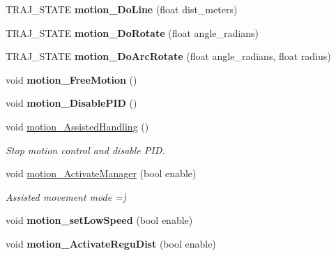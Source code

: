 \begin{DoxyCompactItemize}
T\+R\+A\+J\+\_\+\+S\+T\+A\+TE {\bfseries motion\+\_\+\+Do\+Line} (float dist\+\_\+meters)
\item 
\mbox{\label{classAsservDriver_aca1011c3fb10e594e836ea4ada6b92ff}} 
T\+R\+A\+J\+\_\+\+S\+T\+A\+TE {\bfseries motion\+\_\+\+Do\+Rotate} (float angle\+\_\+radians)
\item 
\mbox{\label{classAsservDriver_aabc36af66a38e2fb735e764730328994}} 
T\+R\+A\+J\+\_\+\+S\+T\+A\+TE {\bfseries motion\+\_\+\+Do\+Arc\+Rotate} (float angle\+\_\+radians, float radius)
\item 
\mbox{\label{classAsservDriver_aac603258c40d4c9aede0e5fce6ed4dea}} 
void {\bfseries motion\+\_\+\+Free\+Motion} ()
\item 
\mbox{\label{classAsservDriver_a0a68a702d1fea277c2e24e6dceb2d646}} 
void {\bfseries motion\+\_\+\+Disable\+P\+ID} ()
\item 
\mbox{\label{classAsservDriver_a733d0cddfdb612cea9e8097b348537f1}} 
void \hyperlink{classAsservDriver_a733d0cddfdb612cea9e8097b348537f1}{motion\+\_\+\+Assisted\+Handling} ()
\begin{DoxyCompactList}\small\item\em Stop motion control and disable P\+ID. \end{DoxyCompactList}\item 
\mbox{\label{classAsservDriver_aaeb3c80c8a079c812af38273f825c537}} 
void \hyperlink{classAsservDriver_aaeb3c80c8a079c812af38273f825c537}{motion\+\_\+\+Activate\+Manager} (bool enable)
\begin{DoxyCompactList}\small\item\em Assisted movement mode =) \end{DoxyCompactList}\item 
\mbox{\label{classAsservDriver_a788b3e067b54d81241f3cafde73019c3}} 
void {\bfseries motion\+\_\+set\+Low\+Speed} (bool enable)
\item 
\mbox{\label{classAsservDriver_a48e4f69bf857d6a18098dc48615a61f1}} 
void {\bfseries motion\+\_\+\+Activate\+Regu\+Dist} (bool enable)

\end{DoxyCompactItemize}
